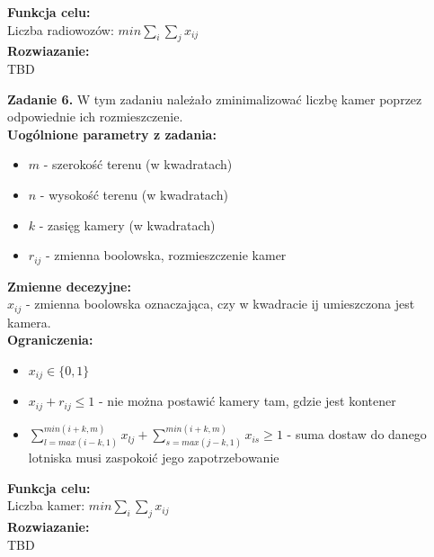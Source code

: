 \documentclass[15pt, a4paper]{article}
\begin{document}
\noindent\textbf{Funkcja celu:}\\

Liczba radiowozów: \(min \sum_{i}\sum_{j}x_{ij} \)\\

\noindent\textbf{Rozwiazanie:}\\ 

TBD

\vspace{0.5cm}

\noindent\hrulefill

\vspace{0.5cm}


\noindent\textbf{Zadanie 6.} W tym zadaniu należało zminimalizować liczbę kamer poprzez odpowiednie ich rozmieszczenie.\\

\noindent\textbf{Uogólnione parametry z zadania:}

\begin{itemize}
    \item \( m \) - szerokość terenu (w kwadratach)
    \item \( n \) - wysokość terenu (w kwadratach)
    \item \( k \) - zasięg kamery (w kwadratach)
    \item \( r_{ij} \) - zmienna boolowska, rozmieszczenie kamer
\end{itemize}

\noindent\textbf{Zmienne decezyjne:}\\

\(x_{ij}\) - zmienna boolowska oznaczająca, czy w kwadracie ij umieszczona jest kamera.\\

\noindent\textbf{Ograniczenia:}

\begin{itemize}
    \item \(x_{ij} \in \{0, 1\} \)
    \item \(x_{ij} + r_{ij} \leq 1 \) - nie można postawić kamery tam, gdzie jest kontener
    \item \(\sum_{l = max(i-k, 1)}^{min(i+k,m)}x_{lj} + \sum_{s = max(j-k, 1)}^{min(i+k,m)}x_{is} \geq 1 \)  - suma dostaw do danego lotniska musi zaspokoić jego zapotrzebowanie 
\end{itemize}

\noindent\textbf{Funkcja celu:}\\

Liczba kamer: \(min \sum_{i}\sum_{j}x_{ij} \)\\

\noindent\textbf{Rozwiazanie:}\\ 

TBD

\vspace{0.5cm}
\end{document}
